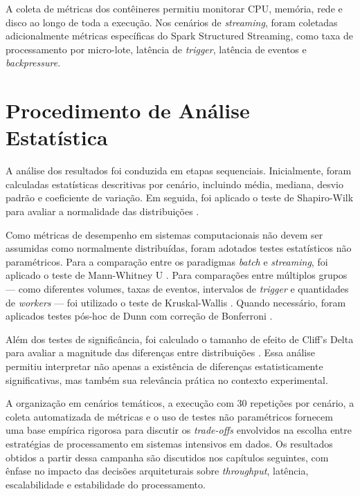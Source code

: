 A coleta de métricas dos contêineres permitiu monitorar CPU, memória, rede e disco ao longo de toda a execução. Nos cenários de \textit{streaming}, foram coletadas adicionalmente métricas específicas do Spark Structured Streaming, como taxa de processamento por micro-lote, latência de \textit{trigger}, latência de eventos e \textit{backpressure}.
 

\section{Procedimento de Análise Estatística}
\label{sec:analise-estatistica-experimento}
 
A análise dos resultados foi conduzida em etapas sequenciais. Inicialmente, foram calculadas estatísticas descritivas por cenário, incluindo média, mediana, desvio padrão e coeficiente de variação. Em seguida, foi aplicado o teste de Shapiro-Wilk para avaliar a normalidade das distribuições \cite{shapiro1965analysis}.
 
Como métricas de desempenho em sistemas computacionais não devem ser assumidas como normalmente distribuídas, foram adotados testes estatísticos não paramétricos. Para a comparação entre os paradigmas \textit{batch} e \textit{streaming}, foi aplicado o teste de Mann-Whitney U \cite{mann1947test}. Para comparações entre múltiplos grupos --- como diferentes volumes, taxas de eventos, intervalos de \textit{trigger} e quantidades de \textit{workers} --- foi utilizado o teste de Kruskal-Wallis \cite{kruskal1952use}. Quando necessário, foram aplicados testes pós-hoc de Dunn com correção de Bonferroni \cite{dunn1964multiple}.
 
Além dos testes de significância, foi calculado o tamanho de efeito de Cliff's Delta para avaliar a magnitude das diferenças entre distribuições \cite{cliff1993dominance}. Essa análise permitiu interpretar não apenas a existência de diferenças estatisticamente significativas, mas também sua relevância prática no contexto experimental.
 
A organização em cenários temáticos, a execução com 30 repetições por cenário, a coleta automatizada de métricas e o uso de testes não paramétricos fornecem uma base empírica rigorosa para discutir os \textit{trade-offs} envolvidos na escolha entre estratégias de processamento em sistemas intensivos em dados. Os resultados obtidos a partir dessa campanha são discutidos nos capítulos seguintes, com ênfase no impacto das decisões arquiteturais sobre \textit{throughput}, latência, escalabilidade e estabilidade do processamento.
